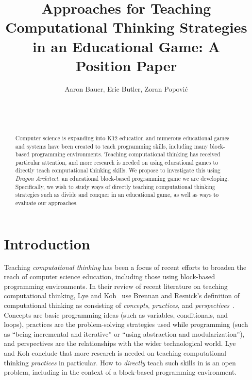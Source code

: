 \documentclass{sig-alternate}
\begin{document}
%

\title{Approaches for Teaching Computational Thinking Strategies in an Educational Game: A Position Paper}

\author{
  \alignauthor
  Aaron Bauer, Eric Butler, Zoran Popovi\'c\\
  \\
  \\
  \\
}

\maketitle
\begin{abstract}
Computer science is expanding into K12 education and numerous educational games and systems have been created to teach programming skills, including many block-based programming environments. Teaching computational thinking has received particular attention, and more research is needed on using educational games to directly teach computational thinking skills. We propose to investigate this using \emph{Dragon Architect}, an educational block-based programming game we are developing. Specifically, we wish to study ways of directly teaching computational thinking strategies such as divide and conquer in an educational game, as well as ways to evaluate our approaches. 
\end{abstract}

\section{Introduction}

Teaching \emph{computational thinking} has been a focus of recent efforts to broaden the reach of computer science education, including those using block-based programming environments. 
In their review of recent literature on teaching computational thinking, Lye and Koh~\cite{lye2014review} use Brennan and Resnick's definition of computational thinking as consisting of \emph{concepts}, \emph{practices}, and \emph{perspectives}~\cite{brennan2012new}. 
Concepts are basic programming ideas (such as variables, conditionals, and loops), practices are the problem-solving strategies used while programming (such as ``being incremental and iterative'' or ``using abstraction and modularization''), and perspectives are the relationships with the wider technological world. 
Lye and Koh conclude that more research is needed on teaching computational thinking \emph{practices} in particular. 
How to \emph{directly} teach such skills in is an open problem, including in the context of a block-based programming environment. 
\end{document}
